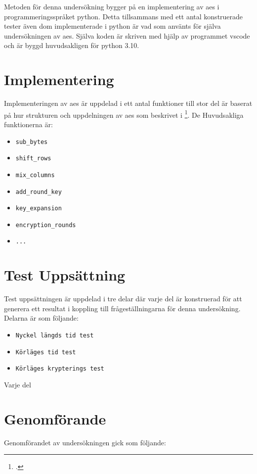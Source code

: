 Metoden för denna undersökning bygger på en implementering av \acrshort{aes} i programmeringsspråket
\gls{python}. Detta tillsammans med ett antal konstruerade tester även dom implementerade i
\gls{python} är vad som använts för själva undersökningen av \acrshort{aes}. Själva koden
är skriven med hjälp av programmet \gls{vscode} och är byggd huvudsakligen för \gls{python} 3.10.

\section{Implementering}
Implementeringen av \acrshort{aes} är uppdelad i ett antal funktioner till stor del är baserat på
hur strukturen och uppdelningen av \acrshort{aes} som beskrivet i \footcite{daemen1999aes}.
De Huvudsakliga funktionerna är:
\begin{itemize}
    \item \texttt{sub\_bytes}
    \item \texttt{shift\_rows}
    \item \texttt{mix\_columns}
    \item \texttt{add\_round\_key}
    \item \texttt{key\_expansion}
    \item \texttt{encryption\_rounds}
    \item \texttt{...}
\end{itemize}

\section{Test Uppsättning}
Test uppsättningen är uppdelad i tre delar där varje del är konstruerad för att generera ett
resultat i koppling till frågeställningarna för denna undersökning. Delarna är som följande:

\begin{itemize}
    \item \texttt{Nyckel längds tid test}
    \item \texttt{Körläges tid test}
    \item \texttt{Körläges krypterings test}
\end{itemize}

Varje del

\section{Genomförande}
Genomförandet av undersökningen gick som följande: